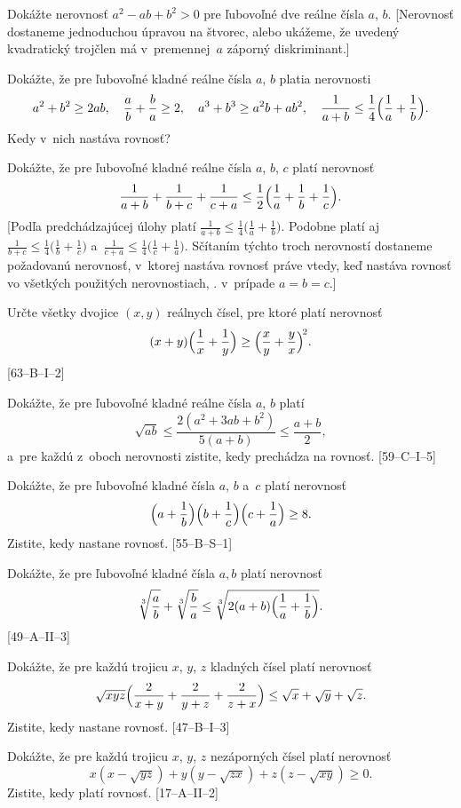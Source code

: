 {
Dokážte nerovnosť $a^2-ab+b^2>0$ pre ľubovoľné dve reálne čísla $a$, $b$. [Nerovnosť dostaneme
jednoduchou úpravou na štvorec, alebo ukážeme, že uvedený kvadratický trojčlen má
v~premennej~$a$ záporný diskriminant.]

Dokážte, že pre ľubovoľné kladné reálne čísla $a$, $b$ platia nerovnosti
$$
\postdisplaypenalty 10000
a^2+b^2\ge 2ab,\quad \frac ab+\frac ba\ge 2,\quad
a^3+b^3\ge a^2b+ab^2,\quad
\frac1{a+b}\le \frac14\Bigl( \frac1a+\frac1b\Bigr).$$
Kedy v~nich nastáva rovnosť?

Dokážte, že pre ľubovoľné kladné reálne čísla $a$, $b$, $c$ platí nerovnosť
$$\frac1{a+b}+\frac1{b+c}+\frac1{c+a}\le \frac12\Bigl(
\frac1a+\frac1b+\frac1c\Bigr).$$
[Podľa predchádzajúcej úlohy platí
$\frac1{a+b}\le \frac14\bigl(\frac1a+\frac1b\bigr)$. Podobne platí
aj $\frac1{b+c}\le \frac14\bigl(\frac1b+\frac1c\bigr)$
a~$\frac1{c+a}\le \frac14\bigl(\frac1c+\frac1a\bigr)$.
Sčítaním týchto troch nerovností dostaneme požadovanú nerovnosť, v~ktorej nastáva
rovnosť práve vtedy, keď nastáva rovnosť vo všetkých použitých nerovnostiach, \tj. v~prípade
$a=b=c$.]

Určte všetky dvojice $(x, y)$ reálnych čísel, pre ktoré platí nerovnosť
$$
(x + y)\Bigl(\frac1x+\frac1y\Bigr)\ge\Bigl(\frac xy+\frac yx\Bigr)^{\!2}.
$$
[63--B--I--2]

Dokážte, že pre ľubovoľné kladné reálne čísla $a$, $b$ platí
$$\sqrt{ab}\le\frac{2(a^2+3ab+b^2)}{5(a+b)}\le\frac{a+b}2,$$
a~pre každú z~oboch nerovnosti zistite, kedy prechádza na rovnosť.
[59--C--I--5]

Dokážte, že pre ľubovoľné kladné čísla $a$, $b$ a~$c$ platí nerovnosť
$$\def\V#1#2{\Bigl(#1+\frac1{\vphantom{b}#2}\Bigr)}
\V ab \V bc \V ca \ge 8.$$
Zistite, kedy nastane rovnosť.
[55--B--S--1]

\D
Dokážte, že pre ľubovoľné kladné čísla $a,b$ platí nerovnosť
$$\def\ba{\frac{b}{\vphantom{b}a}}
\def\ab{\frac{\vphantom{b}a}{b}}
\root 3 \of \ab+\root 3 \of \ba \le\root 3\of
{2(a+b)\Bigl(\frac1{\vphantom{b}a}+\frac1{b}\Bigr)}.$$
[49--A--II--3]

Dokážte, že pre každú trojicu $x$, $y$, $z$ kladných čísel platí nerovnosť
$$\sqrt{xyz}\Bigl(\frac2{x+y}+\frac2{y+z}+\frac2{z+x}\Bigr)
\le \sqrt x+\sqrt y +\sqrt z.$$
Zistite, kedy nastane rovnosť.
[47--B--I--3]

Dokážte, že pre každú trojicu $x$, $y$, $z$ nezáporných čísel platí nerovnosť
$$x(x-\sqrt{yz})+y(y-\sqrt{zx})+z(z-\sqrt{xy}) \ge 0.$$
Zistite, kedy platí rovnosť.
[17--A--II--2]
}

